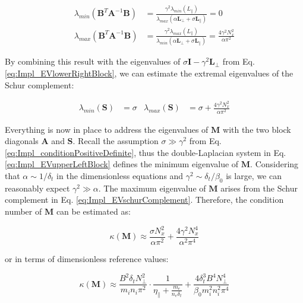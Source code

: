 \begin{align}
	\lambda_{min}(\textbf{B}^T \textbf{A}^{-1}\textbf{B}) &= \frac{\gamma^2\lambda_{min}(L_\parallel)}{\lambda_{max}(\alpha \textbf{L}_\perp + \sigma \textbf{L}_\parallel)} = 0 \\ 
	\lambda_{max}(\textbf{B}^T \textbf{A}^{-1}\textbf{B}) &= \frac{\gamma^2\lambda_{max}(L_\parallel)}{\lambda_{min}(\alpha \textbf{L}_\perp + \sigma \textbf{L}_\parallel)} = \frac{4\gamma^2N_x^2}{\alpha\pi^2}
\end{align}

By combining this result with the eigenvalues of $\sigma \textbf{I} - \gamma^2 \textbf{L}_\perp$ from Eq. \ref{eq:Impl_EVlowerRightBlock}, we can estimate the extremal eigenvalues of the Schur complement:

\begin{align}
	\label{eq:Impl_EVschurComplement}
	\lambda_{min}(\textbf{S}) &= \sigma  & 
	\lambda_{max}(\textbf{S}) &= \sigma + \frac{4\gamma^2N_x^2}{\alpha\pi^2}
\end{align}

Everything is now in place to address the eigenvalues of $\mathbf{M}$ with the two block diagonals $\textbf{A}$ and $\textbf{S}$. Recall the assumption $\sigma \gg \gamma^2$ from Eq. \ref{eq:Impl_conditionPositiveDefinite}, thus the double-Laplacian system in Eq. \ref{eq:Impl_EVupperLeftBlock} defines the minimum eigenvalue of $\textbf{M}$. Considering that $\alpha \sim 1/\delta_t$ in the dimensionless equations and $\gamma^2 \sim \delta_t / \beta_0$ is large, we can reasonably expect $\gamma^2 \gg \alpha$. The maximum eigenvalue of $\textbf{M}$ arises from the Schur complement in Eq. \ref{eq:Impl_EVschurComplement}. Therefore, the condition number of $\textbf{M}$ can be estimated as:

\begin{equation}
	\label{eq:Impl_conditionNumberM}
	\kappa(\textbf{M}) \approx \frac{\sigma N_x^2}{\alpha\pi^2} + \frac{4\gamma^2N_x^4}{\alpha^2\pi^4}
\end{equation}

or in terms of dimensionless reference values:

\begin{equation}
	\label{eq:Impl_conditionNumberElectromagneticVorticitySystem}
	\boxed{
		\kappa(\textbf{M}) \approx \frac{ B^2\delta_t N_\perp^2}{m_in_i\pi^2} \cdot \frac{1}{\eta_\parallel + \frac{m_e}{n_e \delta_t}} + \frac{4\delta_t^3 B^4 N_\perp^4}{\beta_0m_i^2n_i^2\pi^4}
	}
\end{equation}

